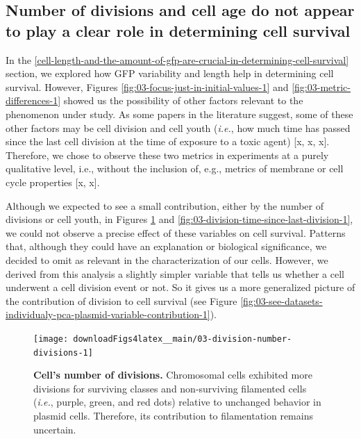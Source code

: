 \documentclass[a4paper, nobind]{templates/ociamthesis}
\begin{document}
\hypertarget{number-of-divisions-and-cell-age-do-not-appear-to-play-a-clear-role-in-determining-cell-survival}{%
\subsection{Number of divisions and cell age do not appear to play a clear role in determining cell survival}\label{number-of-divisions-and-cell-age-do-not-appear-to-play-a-clear-role-in-determining-cell-survival}}

In the \ref{cell-length-and-the-amount-of-gfp-are-crucial-in-determining-cell-survival} section, we explored how GFP variability and length help in determining cell survival.
However, Figures \ref{fig:03-focus-just-in-initial-values-1} and \ref{fig:03-metric-differences-1} showed us the possibility of other factors relevant to the phenomenon under study.
As some papers in the literature suggest, some of these other factors may be cell division and cell youth (\emph{i.e.}, how much time has passed since the last cell division at the time of exposure to a toxic agent) {[}x, x, x{]}.
Therefore, we chose to observe these two metrics in experiments at a purely qualitative level, i.e., without the inclusion of, e.g., metrics of membrane or cell cycle properties {[}x, x{]}.

Although we expected to see a small contribution, either by the number of divisions or cell youth, in Figures \ref{fig:03-division-number-divisions-1} and \ref{fig:03-division-time-since-last-division-1}, we could not observe a precise effect of these variables on cell survival.
Patterns that, although they could have an explanation or biological significance, we decided to omit as relevant in the characterization of our cells.
However, we derived from this analysis a slightly simpler variable that tells us whether a cell underwent a cell division event or not.
So it gives us a more generalized picture of the contribution of division to cell survival (see Figure \ref{fig:03-see-datasets-individualy-pca-plasmid-variable-contribution-1}).





\begin{figure}[H]
\texttt{[image: downloadFigs4latex\_\_main/03-division-number-divisions-1]} \caption[Cell's number of divisions.]{\textbf{Cell's number of divisions.} Chromosomal cells exhibited more divisions for surviving classes and non-surviving filamented cells (\emph{i.e.}, purple, green, and red dots) relative to unchanged behavior in plasmid cells. Therefore, its contribution to filamentation remains uncertain.}\label{fig:03-division-number-divisions-1}
\end{figure}
\end{document}

